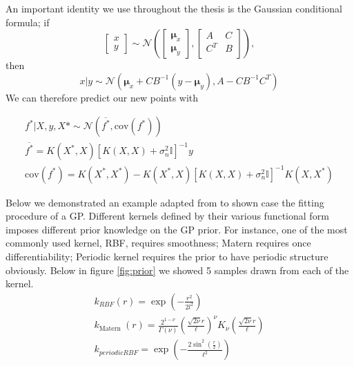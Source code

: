 \documentclass{statsmsc}
\begin{document}
An important identity we use throughout the thesis is the Gaussian conditional formula; if
$$
  \begin{bmatrix}
    x\\y
  \end{bmatrix} 
  \sim \mathcal{N}
  \left(
    \begin{bmatrix}
      \mathbf{\mu}_x\\
      \mathbf{\mu}_y
    \end{bmatrix},
    \begin{bmatrix}
      A & C \\
      C^T & B\\
    \end{bmatrix}
  \right), 
$$ 
then 
\begin{equation}
  x|y\sim \mathcal{N}\left(\mathbf{\mu}_x+CB^{-1}(y-\mathbf{\mu}_y),A-CB^{-1}C^T\right)
  \label{equ:normal_condtion}
\end{equation}
We can therefore predict our new points with 

\begin{equation*}
\begin{gathered}
f^*|X, y, X* \sim \mathcal{N} \left(\overline{f^*}, \mathrm{cov}(f^*)\right)\\ 
\overline{f^*} = K(X^*, X)[K(X,X)+\sigma^2_n\mathbb{I}]^{-1}y\\
\mathrm{cov}(f^*) = K(X^*, X^*) - K(X^*, X)[K(X, X)+\sigma^2_n\mathbb{I}]^{-1}K(X, X^*)
\end{gathered}
\end{equation*}
 

Below we demonstrated an example adapted from \cite{GPflow2017} to shown case the fitting procedure of a GP.
Different kernels defined by their various functional form imposes different prior knowledge on the GP prior.
For instance, one of the most commonly used kernel, RBF, requires smoothness; Matern requires once differentiability; Periodic kernel requires the prior to have periodic structure obviously.
Below in figure \ref{fig:prior} we showed 5 samples drawn from each of the kernel.
\begin{equation*}
  \begin{gathered}
    k_{RBF}(r) = \exp(-\frac{r^2}{2l^2}) \\
    k_{\text {Matern }}(r)=\frac{2^{1-\nu}}{\Gamma(\nu)}\left(\frac{\sqrt{2 \nu} r}{\ell}\right)^{\nu} K_{\nu}\left(\frac{\sqrt{2 \nu} r}{\ell}\right) \\
    k_{periodic RBF}=\exp \left(-\frac{2 \sin ^{2}\left(\frac{r}{2}\right)}{\ell^{2}}\right)
  \end{gathered}
\end{equation*}
\end{document}
